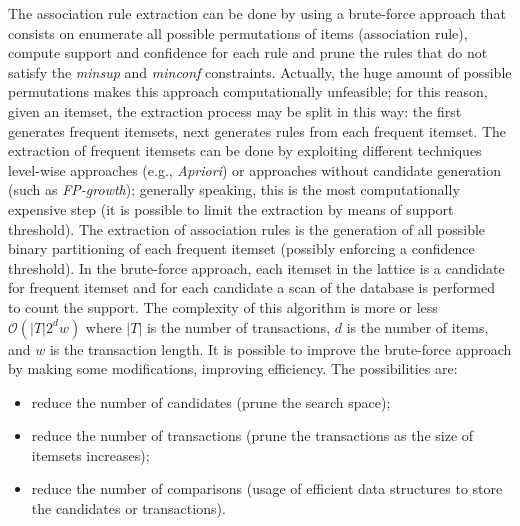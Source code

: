The association rule extraction can be done by using a brute-force approach that consists on enumerate all possible permutations of items (association rule), compute support and confidence for each rule and prune the rules that do not satisfy the \emph{minsup} and \emph{minconf} constraints.
Actually, the huge amount of possible permutations makes this approach computationally unfeasible; for this reason, given an itemset, the extraction process may be split in this way: the first generates frequent itemsets, next generates rules from each frequent itemset.
The extraction of frequent itemsets can be done by exploiting different techniques level-wise approaches (e.g., \emph{Apriori}) or approaches without candidate generation (such as \emph{FP-growth}); generally speaking, this is the most computationally expensive step (it is possible to limit the extraction by means of support threshold).
The extraction of association rules is the generation of all possible binary partitioning of each frequent itemset (possibly enforcing a confidence threshold).
In the brute-force approach, each itemset in the lattice is a candidate for frequent itemset and for each candidate a scan of the database is performed to count the support.
The complexity of this algorithm is more or less $\mathcal{O}\left(|T| 2^d w\right)$ where $|T|$ is the number of transactions, $d$ is the number of items, and $w$ is the transaction length.
It is possible to improve the brute-force approach by making some modifications, improving efficiency.
The possibilities are:
\begin{itemize}
	\item
	reduce the number of candidates (prune the search space);
	\item
	reduce the number of transactions (prune the transactions as the size of itemsets increases);
	\item
	reduce the number of comparisons (usage of efficient data structures to store the candidates or transactions).
\end{itemize}


